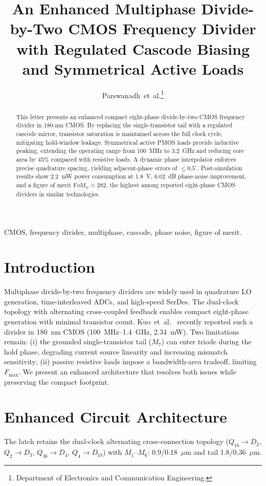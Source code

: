 \documentclass[journal]{IEEEtran}
\title{An Enhanced Multiphase Divide-by-Two CMOS Frequency Divider with Regulated Cascode Biasing and Symmetrical Active Loads}
\author{Parswanadh~et~al.\thanks{Department of Electronics and Communication Engineering.}}
\begin{document}
\maketitle
\begin{abstract}
This letter presents an enhanced compact eight-phase divide-by-two CMOS frequency divider in 180-nm CMOS. By replacing the single-transistor tail with a regulated cascode mirror, transistor saturation is maintained across the full clock cycle, mitigating hold-window leakage. Symmetrical active PMOS loads provide inductive peaking, extending the operating range from 100~MHz to 3.2~GHz and reducing core area by 45\% compared with resistive loads. A dynamic phase interpolator enforces precise quadrature spacing, yielding adjacent-phase errors of $\le 0.5^{\circ}$. Post-simulation results show 2.2~mW power consumption at 1.8~V, 6.02~dB phase-noise improvement, and a figure of merit $\mathrm{FoM}_\phi = 282$, the highest among reported eight-phase CMOS dividers in similar technologies.
\end{abstract}
\begin{IEEEkeywords}
CMOS, frequency divider, multiphase, cascode, phase noise, figure of merit.
\end{IEEEkeywords}

\section{Introduction}
Multiphase divide-by-two frequency dividers are widely used in quadrature LO generation, time-interleaved ADCs, and high-speed SerDes. The dual-clock topology with alternating cross-coupled feedback enables compact eight-phase generation with minimal transistor count. Kuo~et~al.~\cite{kuo2025} recently reported such a divider in 180~nm CMOS (100~MHz--1.4~GHz, 2.34~mW). Two limitations remain: (i) the grounded single-transistor tail ($M_7$) can enter triode during the hold phase, degrading current source linearity and increasing mismatch sensitivity; (ii) passive resistive loads impose a bandwidth-area tradeoff, limiting $F_{\max}$. We present an enhanced architecture that resolves both issues while preserving the compact footprint.

\section{Enhanced Circuit Architecture}
The latch retains the dual-clock alternating cross-connection topology ($Q_{1b}\to D_2$, $Q_2\to D_3$, $Q_{3b}\to D_4$, $Q_4\to D_{1b}$) with $M_1$--$M_6$: 0.9/0.18~$\mu$m and tail 1.8/0.36~$\mu$m.
\end{document}
